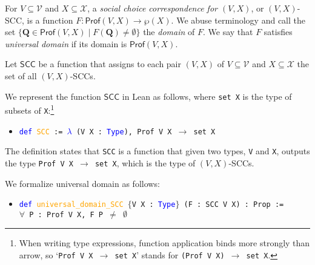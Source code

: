 \documentclass[runningheads]{llncs}
\begin{document}



\begin{definition} \textnormal{For $V\subseteq\mathcal{V}$ and $X\subseteq\mathcal{X}$, a \textit{social choice correspondence for $(V,X)$}, or $(V,X)$-SCC, is a function  $F: \mathsf{Prof}(V,X)\to \wp(X)$. We abuse terminology and call the set $\{\mathbf{Q}\in\mathsf{Prof}(V,X)\mid F(\mathbf{Q})\neq\emptyset \}$ the \textit{domain} of $F$. We say that $F$ satisfies \textit{universal domain} if its domain is $\mathsf{Prof}(V,X)$.}

\textnormal{Let $\mathsf{SCC}$ be a function that assigns to each pair $(V,X)$ of $V\subseteq\mathcal{V}$ and $X\subseteq\mathcal{X}$ the set of all $(V,X)$-SCCs.}
\end{definition}

We represent the function $\mathsf{SCC}$ in Lean as follows, where \texttt{set X} is the type of subsets of \texttt{X}:\footnote{When writing type expressions, function application binds more strongly than arrow, so `\texttt{Prof V X $\to$ set X}' stands for \texttt{(Prof V X) $\to$ set X}.}
\begin{itemize}
\item[] \texttt{\textcolor{blue}{def} \textcolor{orange}{SCC} := \textcolor{blue}{$\lambda$} (V X : \textcolor{blue}{Type}), Prof V X $\to$ set X}
\end{itemize}
The definition states that \texttt{SCC} is a function that given two types, \texttt{V} and \texttt{X}, outputs the type \texttt{Prof V X $\to$ set X}, which is the type of $(V,X)$-SCCs. 

We formalize universal domain as follows:
\begin{itemize}
\item[] \texttt{\textcolor{blue}{def} \textcolor{orange}{universal\_domain\_SCC} $\{$V X : \textcolor{blue}{Type}$\}$ (F : SCC V X) : Prop :=} \\
\texttt{$\forall$ P : Prof V X, F P $\neq$ $\emptyset$}

\end{itemize}
\end{document}
